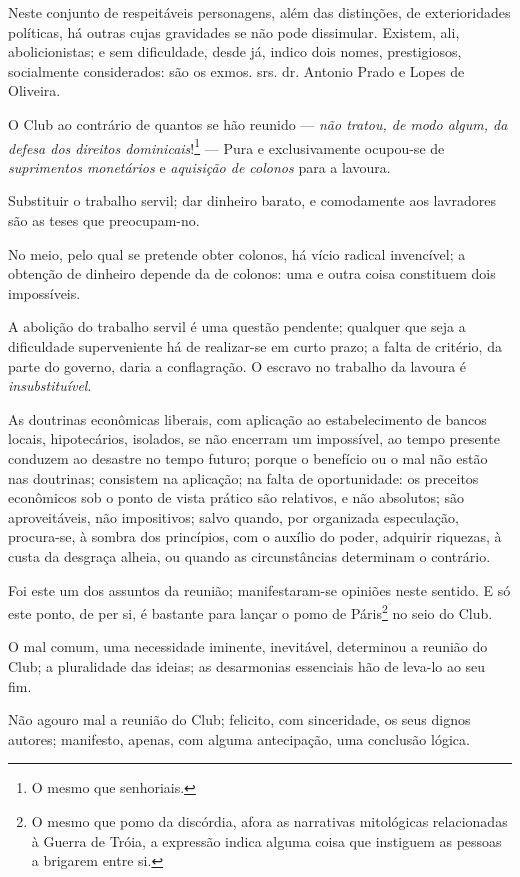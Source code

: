 Neste conjunto de respeitáveis personagens, além das distinções, de
exterioridades políticas, há outras cujas gravidades se não pode
dissimular. Existem, ali, abolicionistas; e sem dificuldade, desde já,
indico dois nomes, prestigiosos, socialmente considerados: são os exmos.
srs. dr. Antonio Prado e Lopes de Oliveira.

O Club ao contrário de quantos se hão reunido --- \emph{não tratou, de
modo algum, da defesa dos direitos dominicais}!\footnote{O mesmo que
  senhoriais.} --- Pura e exclusivamente ocupou-se de \emph{suprimentos
monetários} e \emph{aquisição de colonos} para a lavoura.

Substituir o trabalho servil; dar dinheiro barato, e comodamente aos
lavradores são as teses que preocupam-no.

No meio, pelo qual se pretende obter colonos, há vício radical
invencível; a obtenção de dinheiro depende da de colonos: uma e outra
coisa constituem dois impossíveis.

A abolição do trabalho servil é uma questão pendente; qualquer que seja
a dificuldade superveniente há de realizar-se em curto prazo; a falta de
critério, da parte do governo, daria a conflagração. O escravo no
trabalho da lavoura é \emph{insubstituível}.

As doutrinas econômicas liberais, com aplicação ao estabelecimento de
bancos locais, hipotecários, isolados, se não encerram um impossível, ao
tempo presente conduzem ao desastre no tempo futuro; porque o benefício
ou o mal não estão nas doutrinas; consistem na aplicação; na falta de
oportunidade: os preceitos econômicos sob o ponto de vista prático são
relativos, e não absolutos; são aproveitáveis, não impositivos; salvo
quando, por organizada especulação, procura-se, à sombra dos princípios,
com o auxílio do poder, adquirir riquezas, à custa da desgraça alheia,
ou quando as circunstâncias determinam o contrário.

Foi este um dos assuntos da reunião; manifestaram-se opiniões neste
sentido. E só este ponto, de per si, é bastante para lançar o pomo de
Páris\footnote{O mesmo que pomo da discórdia, afora as narrativas
  mitológicas relacionadas à Guerra de Tróia, a expressão indica alguma
  coisa que instiguem as pessoas a brigarem entre si.} no seio do Club.

O mal comum, uma necessidade iminente, inevitável, determinou a reunião
do Club; a pluralidade das ideias; as desarmonias essenciais hão de
leva-lo ao seu fim.

Não agouro mal a reunião do Club; felicito, com sinceridade, os seus
dignos autores; manifesto, apenas, com alguma antecipação, uma conclusão
lógica.

